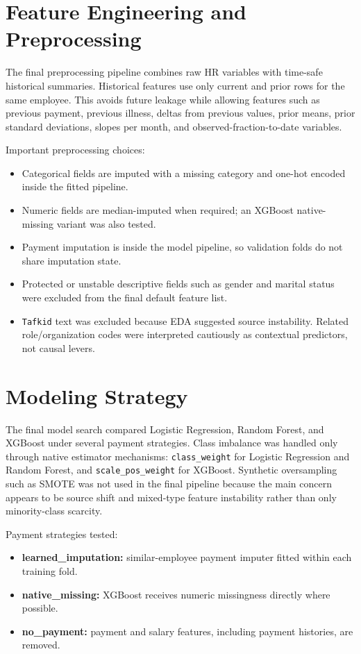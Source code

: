\documentclass[11pt]{article}
\newcommand{\feature}[1]{\texttt{#1}}
\begin{document}
\section{Feature Engineering and Preprocessing}

The final preprocessing pipeline combines raw HR variables with time-safe historical summaries. Historical features use only current and prior rows for the same employee. This avoids future leakage while allowing features such as previous payment, previous illness, deltas from previous values, prior means, prior standard deviations, slopes per month, and observed-fraction-to-date variables.

Important preprocessing choices:
\begin{itemize}
    \item Categorical fields are imputed with a missing category and one-hot encoded inside the fitted pipeline.
    \item Numeric fields are median-imputed when required; an XGBoost native-missing variant was also tested.
    \item Payment imputation is inside the model pipeline, so validation folds do not share imputation state.
    \item Protected or unstable descriptive fields such as gender and marital status were excluded from the final default feature list.
    \item \feature{Tafkid} text was excluded because EDA suggested source instability. Related role/organization codes were interpreted cautiously as contextual predictors, not causal levers.
\end{itemize}

\section{Modeling Strategy}

The final model search compared Logistic Regression, Random Forest, and XGBoost under several payment strategies. Class imbalance was handled only through native estimator mechanisms: \feature{class\_weight} for Logistic Regression and Random Forest, and \feature{scale\_pos\_weight} for XGBoost. Synthetic oversampling such as SMOTE was not used in the final pipeline because the main concern appears to be source shift and mixed-type feature instability rather than only minority-class scarcity.

Payment strategies tested:
\begin{itemize}
    \item \textbf{learned\_imputation:} similar-employee payment imputer fitted within each training fold.
    \item \textbf{native\_missing:} XGBoost receives numeric missingness directly where possible.
    \item \textbf{no\_payment:} payment and salary features, including payment histories, are removed.
\end{itemize}
\end{document}

